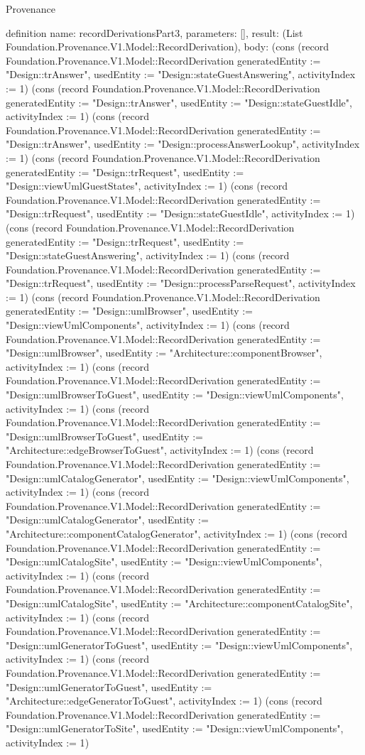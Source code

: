 \begin{lexlean}{Provenance}
\begin{semanticmodule}
definition{
  name: recordDerivationsPart3,
  parameters: [],
  result: (List Foundation.Provenance.V1.Model::RecordDerivation),
  body: (cons (record Foundation.Provenance.V1.Model::RecordDerivation {generatedEntity := "Design::trAnswer", usedEntity := "Design::stateGuestAnswering", activityIndex := 1}) (cons (record Foundation.Provenance.V1.Model::RecordDerivation {generatedEntity := "Design::trAnswer", usedEntity := "Design::stateGuestIdle", activityIndex := 1}) (cons (record Foundation.Provenance.V1.Model::RecordDerivation {generatedEntity := "Design::trAnswer", usedEntity := "Design::processAnswerLookup", activityIndex := 1}) (cons (record Foundation.Provenance.V1.Model::RecordDerivation {generatedEntity := "Design::trRequest", usedEntity := "Design::viewUmlGuestStates", activityIndex := 1}) (cons (record Foundation.Provenance.V1.Model::RecordDerivation {generatedEntity := "Design::trRequest", usedEntity := "Design::stateGuestIdle", activityIndex := 1}) (cons (record Foundation.Provenance.V1.Model::RecordDerivation {generatedEntity := "Design::trRequest", usedEntity := "Design::stateGuestAnswering", activityIndex := 1}) (cons (record Foundation.Provenance.V1.Model::RecordDerivation {generatedEntity := "Design::trRequest", usedEntity := "Design::processParseRequest", activityIndex := 1}) (cons (record Foundation.Provenance.V1.Model::RecordDerivation {generatedEntity := "Design::umlBrowser", usedEntity := "Design::viewUmlComponents", activityIndex := 1}) (cons (record Foundation.Provenance.V1.Model::RecordDerivation {generatedEntity := "Design::umlBrowser", usedEntity := "Architecture::componentBrowser", activityIndex := 1}) (cons (record Foundation.Provenance.V1.Model::RecordDerivation {generatedEntity := "Design::umlBrowserToGuest", usedEntity := "Design::viewUmlComponents", activityIndex := 1}) (cons (record Foundation.Provenance.V1.Model::RecordDerivation {generatedEntity := "Design::umlBrowserToGuest", usedEntity := "Architecture::edgeBrowserToGuest", activityIndex := 1}) (cons (record Foundation.Provenance.V1.Model::RecordDerivation {generatedEntity := "Design::umlCatalogGenerator", usedEntity := "Design::viewUmlComponents", activityIndex := 1}) (cons (record Foundation.Provenance.V1.Model::RecordDerivation {generatedEntity := "Design::umlCatalogGenerator", usedEntity := "Architecture::componentCatalogGenerator", activityIndex := 1}) (cons (record Foundation.Provenance.V1.Model::RecordDerivation {generatedEntity := "Design::umlCatalogSite", usedEntity := "Design::viewUmlComponents", activityIndex := 1}) (cons (record Foundation.Provenance.V1.Model::RecordDerivation {generatedEntity := "Design::umlCatalogSite", usedEntity := "Architecture::componentCatalogSite", activityIndex := 1}) (cons (record Foundation.Provenance.V1.Model::RecordDerivation {generatedEntity := "Design::umlGeneratorToGuest", usedEntity := "Design::viewUmlComponents", activityIndex := 1}) (cons (record Foundation.Provenance.V1.Model::RecordDerivation {generatedEntity := "Design::umlGeneratorToGuest", usedEntity := "Architecture::edgeGeneratorToGuest", activityIndex := 1}) (cons (record Foundation.Provenance.V1.Model::RecordDerivation {generatedEntity := "Design::umlGeneratorToSite", usedEntity := "Design::viewUmlComponents", activityIndex := 1}) }
\end{semanticmodule}
\end{lexlean}
